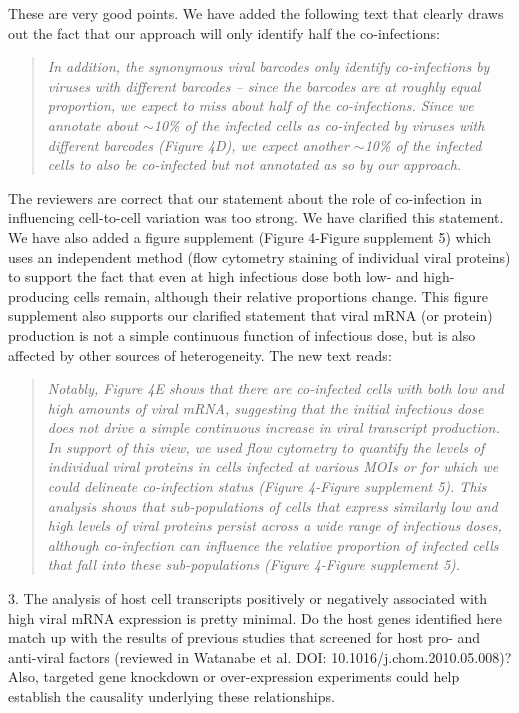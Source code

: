 \documentclass[11pt, oneside]{article}   	%
\begin{document}
{\color{black}
These are very good points.
We have added the following text that clearly draws out the fact that our approach will only identify half the co-infections:
\begin{quote}
\textsl{
In addition, the synonymous viral barcodes only identify co-infections by viruses with different barcodes -- since the barcodes are at roughly equal proportion, we expect to miss about half of the co-infections.
Since we annotate about $\sim$10\% of the infected cells as co-infected by viruses with different barcodes (Figure 4D), we expect another $\sim$10\% of the infected cells to also be co-infected but not annotated as so by our approach.
}
\end{quote}

The reviewers are correct that our statement about the role of co-infection in influencing cell-to-cell variation was too strong.
We have clarified this statement.
We have also added a figure supplement (Figure 4-Figure supplement 5) which uses an independent method (flow cytometry staining of individual viral proteins) to support the fact that even at high infectious dose both low- and high-producing cells remain, although their relative proportions change.
This figure supplement also supports our clarified statement that viral mRNA (or protein) production is not a simple continuous function of infectious dose, but is also affected by other sources of heterogeneity.
The new text reads:
\begin{quote}
\textsl{
Notably, Figure 4E shows that there are co-infected cells with both low and high amounts of viral mRNA, suggesting that the initial infectious dose does not drive a simple continuous increase in viral transcript production.
In support of this view, we used flow cytometry to quantify the levels of individual viral proteins in cells infected at various MOIs or for which we could delineate co-infection status (Figure 4-Figure supplement 5).
This analysis shows that sub-populations of cells that express similarly low and high levels of viral proteins persist across a wide range of infectious doses, although co-infection can influence the relative proportion of infected cells that fall into these sub-populations (Figure 4-Figure supplement 5).
}
\end{quote}
}

3. The analysis of host cell transcripts positively or negatively associated with high viral mRNA expression is pretty minimal. Do the host genes identified here match up with the results of previous studies that screened for host pro- and anti-viral factors (reviewed in Watanabe et al. DOI: 10.1016/j.chom.2010.05.008)? Also, targeted gene knockdown or over-expression experiments could help establish the causality underlying these relationships. 
\end{document}
